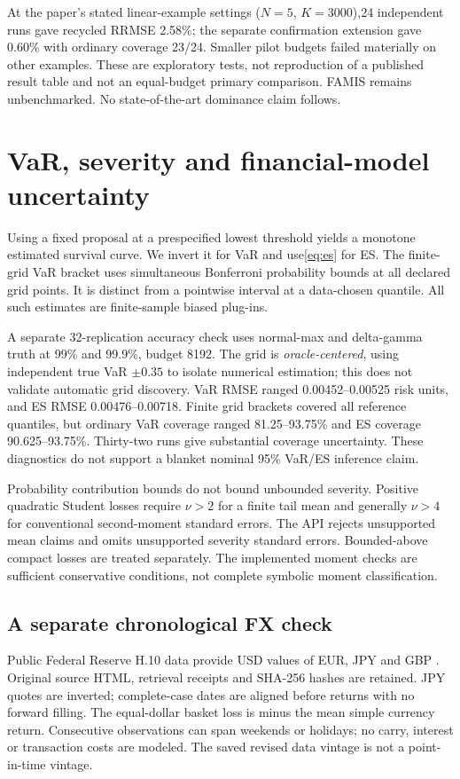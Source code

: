 \documentclass[11pt]{article}
\begin{document}
At the paper's stated linear-example settings ($ N=5 $, $ K=3000 $),24 independent runs gave recycled RRMSE 2.58\%; the separate confirmation extension gave 0.60\% with ordinary coverage 23/24. Smaller pilot budgets failed materially on other examples. These are exploratory tests, not reproduction of a published result table and not an equal-budget primary comparison. FAMIS remains unbenchmarked. No state-of-the-art dominance claim follows.

\section{VaR, severity and financial-model uncertainty}
Using a fixed proposal at a prespecified lowest threshold yields a monotone estimated survival curve. We invert it for VaR and use\eqref{eq:es} for ES. The finite-grid VaR bracket uses simultaneous Bonferroni probability bounds at all declared grid points. It is distinct from a pointwise interval at a data-chosen quantile. All such estimates are finite-sample biased plug-ins.

A separate 32-replication accuracy check uses normal-max and delta-gamma truth at 99\% and 99.9\%, budget 8192. The grid is \emph{oracle-centered}, using independent true VaR $\pm 0.35 $ to isolate numerical estimation; this does not validate automatic grid discovery. VaR RMSE ranged 0.00452--0.00525 risk units, and ES RMSE 0.00476--0.00718. Finite grid brackets covered all reference quantiles, but ordinary VaR coverage ranged 81.25--93.75\% and ES coverage 90.625--93.75\%. Thirty-two runs give substantial coverage uncertainty. These diagnostics do not support a blanket nominal 95\% VaR/ES inference claim.

Probability contribution bounds do not bound unbounded severity. Positive quadratic Student losses require $\nu>2 $ for a finite tail mean and generally $\nu>4 $ for conventional second-moment standard errors. The API rejects unsupported mean claims and omits unsupported severity standard errors. Bounded-above compact losses are treated separately. The implemented moment checks are sufficient conservative conditions, not complete symbolic moment classification.

\subsection{A separate chronological FX check}
Public Federal Reserve H.10 data provide USD values of EUR, JPY and GBP \citep{fedh10}. Original source HTML, retrieval receipts and SHA-256 hashes are retained. JPY quotes are inverted; complete-case dates are aligned before returns with no forward filling. The equal-dollar basket loss is minus the mean simple currency return. Consecutive observations can span weekends or holidays; no carry, interest or transaction costs are modeled. The saved revised data vintage is not a point-in-time vintage.
\end{document}
